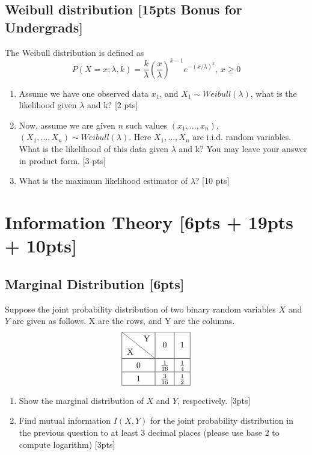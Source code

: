 \documentclass{article}
\begin{document}
\newpage
\subsection{Weibull distribution [15pts Bonus for Undergrads]}
The Weibull distribution is defined as 
$$P(X=x;\lambda,k)=\frac{k}{\lambda}(\frac{x}{\lambda})^{k-1}e^{-(x/\lambda)^k}\text{, }x \geq 0$$
\begin{enumerate}[label=(\alph*)]
    \item Assume we have one observed data $x_1$, and $X_1 \sim Weibull(\lambda)$, what is the likelihood given $ \lambda$ and k? [2 pts]

    \item Now, assume we are given $n$ such values $(x_1,...,x_n)$, $(X_1, ...,X_n)\sim Weibull(\lambda)$. Here $X_1, ...,X_n$ are i.i.d. random variables. What is the likelihood of this data given $\lambda$ and k? You may leave your answer in product form. [3 pts]

    \item What is the maximum likelihood estimator of $\lambda$? [10 pts]
\end{enumerate}


\newpage
\section{Information Theory [6pts + 19pts + 10pts]}
\subsection{Marginal Distribution [6pts]}
Suppose the joint probability distribution of two binary random variables $X$ and $Y$ are given as follows. X are the rows, and Y are the columns.
$$\renewcommand*{\arraystretch}{1.3}
\begin{tabular}{|c|c|c|}
    \hline 
    \diagbox{X}{Y} & {0} & {1} \\ 
    \hline 0 & {$\frac{1}{16}$} & {$\frac{1}{4}$} \\ 
    \hline 1 & {$\frac{3}{16}$} & {$\frac{1}{2}$} \\ 
    \hline
\end{tabular}$$
\begin{enumerate}[label=(\alph*)]
    \item Show the marginal distribution of $X$ and $Y$, respectively. [3pts]

    \item Find mutual information $I(X,Y)$ for the joint probability distribution in the previous question to at least 3 decimal places (please use base 2 to compute logarithm)   [3pts]
\end{enumerate}
\end{document}
